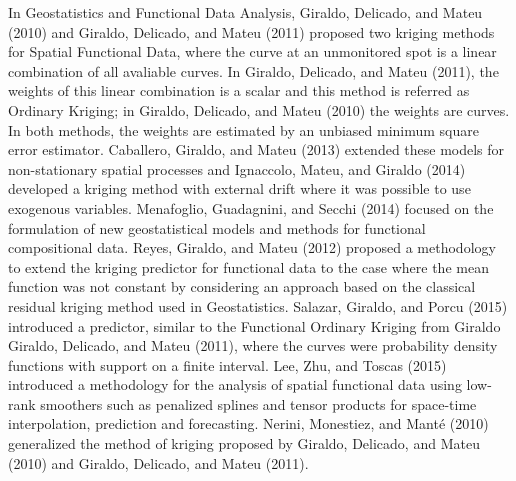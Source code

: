 \documentclass[
  12pt,
]{article}
\theoremstyle{definition}
\theoremstyle{definition}
\theoremstyle{definition}
\theoremstyle{remark}
\begin{document}
In Geostatistics and Functional Data Analysis, Giraldo, Delicado, and Mateu (2010) and Giraldo, Delicado, and Mateu (2011) proposed two kriging methods for Spatial Functional Data, where the curve at an
unmonitored spot is a linear combination of all avaliable curves. In Giraldo, Delicado, and Mateu (2011), the weights of this linear combination is a scalar and this method is referred as
Ordinary Kriging; in Giraldo, Delicado, and Mateu (2010) the weights are curves.
In both methods, the weights are estimated by an unbiased minimum square error estimator.
Caballero, Giraldo, and Mateu (2013) extended these models for non-stationary spatial processes and Ignaccolo, Mateu, and Giraldo (2014) developed a kriging method with external drift where it was possible to use exogenous variables.
Menafoglio, Guadagnini, and Secchi (2014) focused on the formulation of new geostatistical models and methods for functional compositional data.
Reyes, Giraldo, and Mateu (2012) proposed a methodology to extend the kriging predictor for functional data to the case where the mean function was not constant by considering an approach based on the classical residual kriging method used in Geostatistics.
Salazar, Giraldo, and Porcu (2015) introduced a predictor, similar to the Functional Ordinary Kriging from Giraldo
Giraldo, Delicado, and Mateu (2011), where the curves were probability density functions with support on a finite interval.
Lee, Zhu, and Toscas (2015) introduced a methodology for the analysis of spatial functional data using low-rank smoothers such as penalized splines and tensor products for space-time interpolation, prediction and forecasting.
Nerini, Monestiez, and Manté (2010) generalized the method of kriging proposed by Giraldo, Delicado, and Mateu (2010) and Giraldo, Delicado, and Mateu (2011).
\end{document}
